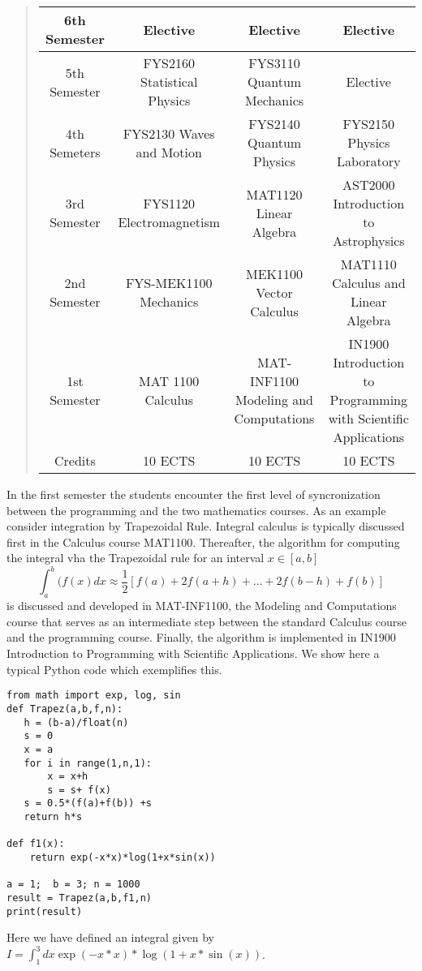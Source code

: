 \documentclass[graybox,envcountchap,sectrefs]{svmult}
\begin{document}
\begin{quote}
\begin{tabular}{cccc}
\hline
\multicolumn{1}{c}{ 6th Semester } & \multicolumn{1}{c}{ Elective } & \multicolumn{1}{c}{ Elective } & \multicolumn{1}{c}{ Elective } \\
\hline
5th Semester & FYS2160 Statistical Physics & FYS3110 Quantum Mechanics             & Elective                                                        \\
\hline
4th Semeters & FYS2130 Waves and Motion    & FYS2140 Quantum Physics               & FYS2150 Physics Laboratory                                      \\
\hline
3rd Semester & FYS1120 Electromagnetism    & MAT1120 Linear Algebra                & AST2000 Introduction to Astrophysics                            \\
\hline
2nd Semester & FYS-MEK1100 Mechanics       & MEK1100 Vector Calculus               & MAT1110 Calculus and Linear Algebra                             \\
\hline
1st Semester & MAT 1100 Calculus           & MAT-INF1100 Modeling and Computations & IN1900 Introduction to Programming with Scientific Applications \\
\hline
Credits      & 10 ECTS                     & 10 ECTS                               & 10 ECTS                                                         \\
\hline
\end{tabular}
\end{quote}

\noindent
In the first semester the students encounter the first level of syncronization between the programming and the two mathematics courses. 
As an example consider integration by Trapezoidal Rule. Integral calculus is typically discussed first in the Calculus course MAT1100.
Thereafter, the algorithm for computing the  integral vha the Trapezoidal rule for an interval $x \in [a,b]$
\[
  \int_a^b(f(x) dx \approx \frac{1}{2}\left [f(a)+2f(a+h)+\dots+2f(b-h)+f(b)\right] 
\]
is discussed and developed in MAT-INF1100, the Modeling and Computations course that serves as an intermediate step between the standard Calculus course and the programming course. Finally, the algorithm is implemented in   IN1900 Introduction to Programming with Scientific Applications.
We show here a typical Python code which exemplifies this.

\begin{lstlisting}
from math import exp, log, sin
def Trapez(a,b,f,n):
   h = (b-a)/float(n)
   s = 0
   x = a
   for i in range(1,n,1):
       x = x+h
       s = s+ f(x)
   s = 0.5*(f(a)+f(b)) +s
   return h*s

def f1(x):
    return exp(-x*x)*log(1+x*sin(x))

a = 1;  b = 3; n = 1000
result = Trapez(a,b,f1,n)
print(result)
\end{lstlisting}
Here we have defined an integral given by $I=\int_1^3 dx \exp{(-x*x)}*\log{(1+x*\sin{(x)})}$.
\end{document}
